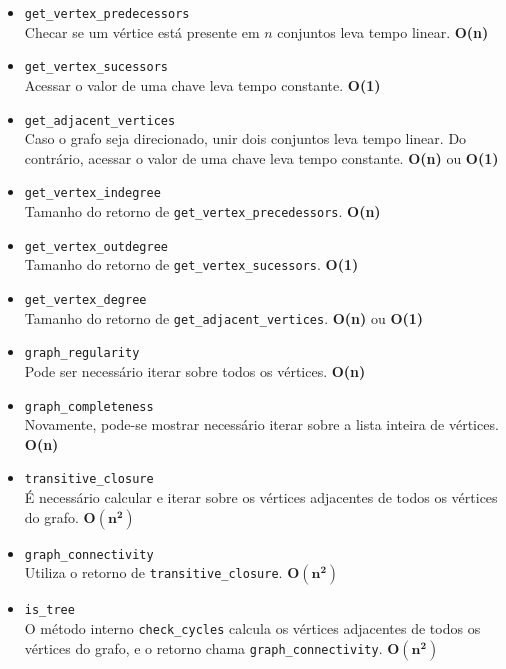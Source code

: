 \documentclass{article}
\begin{document}
\begin{itemize}
    \item \texttt{get\_vertex\_predecessors} \\
    Checar se um vértice está presente em $n$ conjuntos leva tempo linear.
    \textbf{O(n)}

    \item \texttt{get\_vertex\_sucessors} \\
    Acessar o valor de uma chave leva tempo constante. \textbf{O(1)}

    \item \texttt{get\_adjacent\_vertices} \\
    Caso o grafo seja direcionado, unir dois conjuntos leva tempo linear. Do
    contrário, acessar o valor de uma chave leva tempo constante. \textbf{O(n)}
    ou \textbf{O(1)}

    \item \texttt{get\_vertex\_indegree} \\
    Tamanho do retorno de \texttt{get\_vertex\_precedessors}. \textbf{O(n)}

    \item \texttt{get\_vertex\_outdegree} \\
    Tamanho do retorno de \texttt{get\_vertex\_sucessors}. \textbf{O(1)}

    \item \texttt{get\_vertex\_degree} \\
    Tamanho do retorno de \texttt{get\_adjacent\_vertices}. \textbf{O(n)} ou
    \textbf{O(1)}

    \item \texttt{graph\_regularity} \\
    Pode ser necessário iterar sobre todos os vértices. \textbf{O(n)}

    \item \texttt{graph\_completeness} \\
    Novamente, pode-se mostrar necessário iterar sobre a lista inteira de
    vértices. \textbf{O(n)}

    \item \texttt{transitive\_closure} \\
    É necessário calcular e iterar sobre os vértices adjacentes de todos os
    vértices do grafo. $\mathbf{O(n^2)}$

    \item \texttt{graph\_connectivity} \\
    Utiliza o retorno de \texttt{transitive\_closure}. $\mathbf{O(n^2)}$

    \item \texttt{is\_tree} \\
    O método interno \texttt{check\_cycles} calcula os vértices adjacentes de
    todos os vértices do grafo, e o retorno chama \texttt{graph\_connectivity}.
    $\mathbf{O(n^2)}$
\end{itemize}
\end{document}

